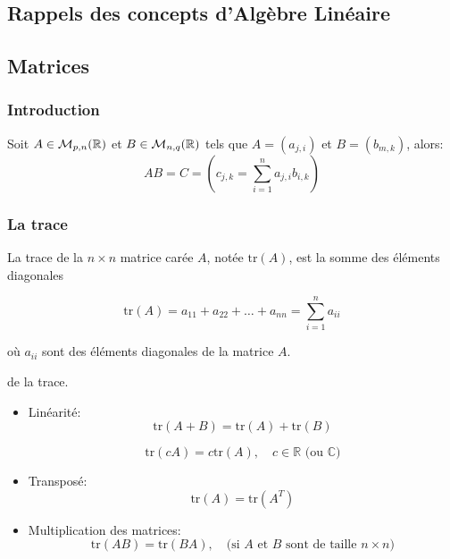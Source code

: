 \begin{appendices}
    \chapter{Rappels des concepts d'Algèbre Linéaire} 
    \section{Matrices}
    \subsection{Introduction}
    \begin{definition}
        Soit $A \in \mathcal{M}_{p, n}(\mathbb{R})$ et $B \in \mathcal{M}_{n, q}(\mathbb{R})$ tels que $A = (a_{j, i})$ et $B = (b_{m, k})$, alors:
         \[
        AB = C = (c_{j, k} = \sum_{i=1}^{n} a_{j, i}b_{i, k})
        \] 
    \end{definition}
    \subsection{La trace}
    \begin{definition}
        La trace de la \( n \times n \) matrice carée \( A \), notée \( \text{tr}(A) \), est la somme des éléments diagonales

        \[
            \text{tr}(A) = a_{11} + a_{22} + \dots + a_{nn} = \sum_{i=1}^{n} a_{ii}
        \]

        où \( a_{ii} \) sont des éléments diagonales de la matrice \( A \). 
    \end{definition}

    \begin{property} de la trace.
       \begin{itemize}
           \item Linéarité:
               \[
                   \text{tr}(A + B) = \text{tr}(A) + \text{tr}(B)
               \]

               \[
                   \text{tr}(cA) = c \text{tr}(A), \quad c \in \mathbb{R} \text{ (ou } \mathbb{C} \text{)}
               \]
            \item  Transposé:
                \[
                    \text{tr}(A) = \text{tr}(A^T)
                \] 
            \item Multiplication des matrices:
                \[
                    \text{tr}(AB) = \text{tr}(BA), \quad \text{(si } A \text{ et } B \text{ sont de taille } n \times n)
                \]


\end{itemize}
\end{property}
\end{appendices}
